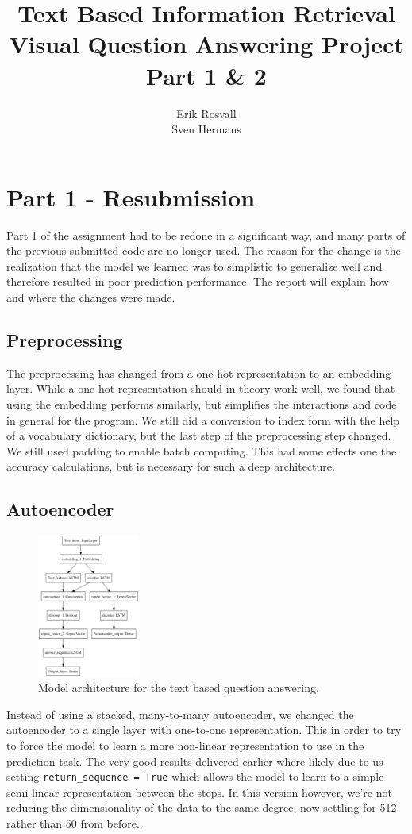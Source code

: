 \documentclass[10pt,a4paper]{report}
\author{Erik Rosvall \\ Sven Hermans}
\title{Text Based Information Retrieval \\ Visual Question Answering Project \\ Part 1 \& 2}
\begin{document}
	\maketitle
	\section*{Part 1 - Resubmission}
		Part 1 of the assignment had to be redone in a significant way, and many parts of the previous submitted code are no longer used. The reason for the change is the realization that the model we learned was to simplistic to generalize well and therefore resulted in poor prediction performance. The report will explain how and where the changes were made.
	\subsection*{Preprocessing}
		The preprocessing has changed from a one-hot representation to an embedding layer. While a one-hot representation should in theory work well, we found that using the embedding performs similarly, but simplifies the interactions and code in general for the program. We still did a conversion to index form with the help of a vocabulary dictionary, but the last step of the preprocessing step changed. We still used padding to enable batch computing. This had some effects one the accuracy calculations, but is necessary for such a deep architecture.
	\subsection*{Autoencoder}
		\begin{figure}
		\begin{center}
			\includegraphics[width=0.3\textwidth]{text_classifier_w_autoencoder.png}
		\end{center}
		\caption{Model architecture for the text based question answering. \label{text_classifier_w_autoencoder}}
	\end{figure}
	Instead of using a stacked, many-to-many autoencoder, we changed the autoencoder to a single layer with one-to-one representation. This in order to try to force the model to learn a more non-linear representation to use in the prediction task. The very good results delivered earlier where likely due to us setting \texttt{return\_sequence = True} which allows the model to learn to a simple semi-linear  representation between the steps. In this version however, we're not reducing the dimensionality of the data to the same degree, now settling for 512 rather than 50 from before..
\end{document}
